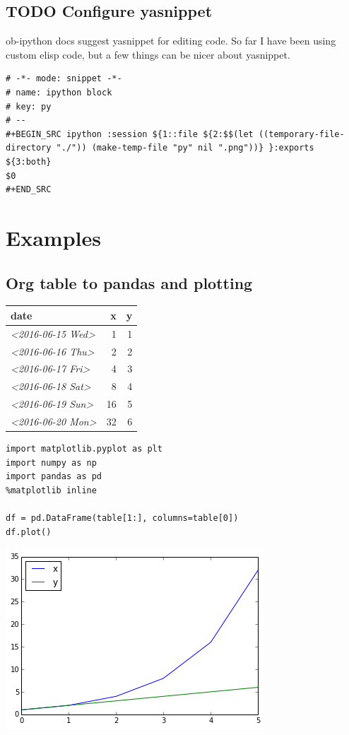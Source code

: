 \documentclass[11pt]{article}
\begin{document}
\subsection{{\bfseries\sffamily TODO} Configure yasnippet}
\label{sec:orgheadline40}
ob-ipython docs suggest yasnippet for editing code.
So far I have been using custom elisp code, but a few things can be nicer about yasnippet.

\begin{verbatim}
# -*- mode: snippet -*-
# name: ipython block
# key: py
# --
#+BEGIN_SRC ipython :session ${1::file ${2:$$(let ((temporary-file-directory "./")) (make-temp-file "py" nil ".png"))} }:exports ${3:both}
$0
#+END_SRC
\end{verbatim}
\section{Examples}
\label{sec:orgheadline6}
\subsection{Org table to pandas and plotting}
\label{sec:orgheadline42}
\begin{center}
\label{tab:orgtable1}
\begin{tabular}{lrr}
\hline
date & x & y\\
\hline
\textit{<2016-06-15 Wed>} & 1 & 1\\
\textit{<2016-06-16 Thu>} & 2 & 2\\
\textit{<2016-06-17 Fri>} & 4 & 3\\
\textit{<2016-06-18 Sat>} & 8 & 4\\
\textit{<2016-06-19 Sun>} & 16 & 5\\
\textit{<2016-06-20 Mon>} & 32 & 6\\
\hline
\end{tabular}
\end{center}

\begin{verbatim}
import matplotlib.pyplot as plt
import numpy as np
import pandas as pd
%matplotlib inline

df = pd.DataFrame(table[1:], columns=table[0])
df.plot()
\end{verbatim}

\includegraphics[width=.9\linewidth]{plot.png}
\end{document}
